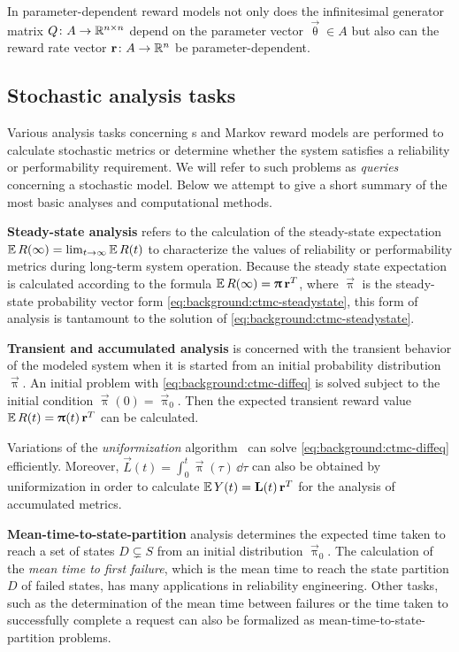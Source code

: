 In parameter-dependent reward models not only does the infinitesimal generator matrix \(Q\colon A \to \mathbb{R}^{n \times n}\) depend on the parameter vector \(\vec{\uptheta} \in A\) but also can the reward rate vector \(\bm{\mathrm{r}}\colon A \to \mathbb{R}^n\) be parameter-dependent.

\subsection{Stochastic analysis tasks}

Various analysis tasks concerning s and Markov reward models are performed to calculate stochastic metrics or determine whether the system satisfies a reliability or performability requirement. We will refer to such problems as \emph{queries} concerning a stochastic model. Below we attempt to give a short summary of the most basic analyses and computational methods.

\newpara \textbf{Steady-state analysis} refers to the calculation of the steady-state expectation \(\operatorname{\mathbb{E}} R(\infty) = \lim_{t \to \infty} \operatorname{\mathbb{E}} R(t)\) to characterize the values of reliability or performability metrics during long-term system operation. Because the steady state expectation is calculated according to the formula \(\operatorname{\mathbb{E}} R(\infty) = \bm{\mathrm{\uppi}} \, \bm{\mathrm{r}}^T\), where \(\vec{\uppi}\) is the steady-state probability vector form \vref{eq:background:ctmc-steadystate}, this form of analysis is tantamount to the solution of \cref{eq:background:ctmc-steadystate}.

\newpara \textbf{Transient and accumulated analysis} is concerned with the transient behavior of the modeled system when it is started from an initial probability distribution \(\vec{\uppi}\). An initial problem with \vref{eq:background:ctmc-diffeq} is solved subject to the initial condition \(\vec{\uppi}(0) = \vec{\uppi}_0\). Then the expected transient reward value \(\operatorname{\mathbb{E}} R(t) = \bm{\mathrm{\uppi}}(t) \, \bm{\mathrm{r}}^T\) can be calculated.

Variations of the \emph{uniformization} algorithm~ can solve \cref{eq:background:ctmc-diffeq} efficiently. Moreover, \(\vec{L}(t) = \int_{0}^{t} \vec{\uppi}(\tau) \,\dd\tau\) can also be obtained by uniformization in order to calculate \(\operatorname{\mathbb{E}} Y(t) = \bm{\mathrm{L}}(t) \, \bm{\mathrm{r}}^T\) for the analysis of accumulated metrics.

\newpara \textbf{Mean-time-to-state-partition} analysis determines the expected time taken to reach a set of states \(D \subsetneq S\) from an initial distribution \(\vec{\uppi}_0\). The calculation of the \emph{mean time to first failure}, which is the mean time to reach the state partition \(D\) of failed states, has many applications in reliability engineering. Other tasks, such as the determination of the mean time between failures or the time taken to successfully complete a request can also be formalized as mean-time-to-state-partition problems.

